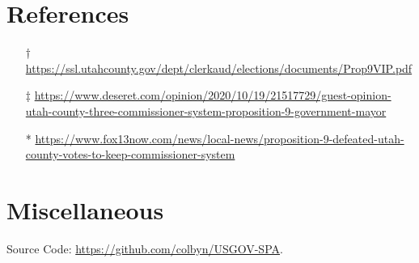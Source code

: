 \pagebreak

\section*{References}

\begin{itemize}
    \item[†] \url{https://ssl.utahcounty.gov/dept/clerkaud/elections/documents/Prop9VIP.pdf}
    \item[‡] \url{https://www.deseret.com/opinion/2020/10/19/21517729/guest-opinion-utah-county-three-commissioner-system-proposition-9-government-mayor}
    \item[*] \url{https://www.fox13now.com/news/local-news/proposition-9-defeated-utah-county-votes-to-keep-commissioner-system}
\end{itemize}


\section*{Miscellaneous}
\begin{center}
    Source Code: \url{https://github.com/colbyn/USGOV-SPA}.
\end{center}
